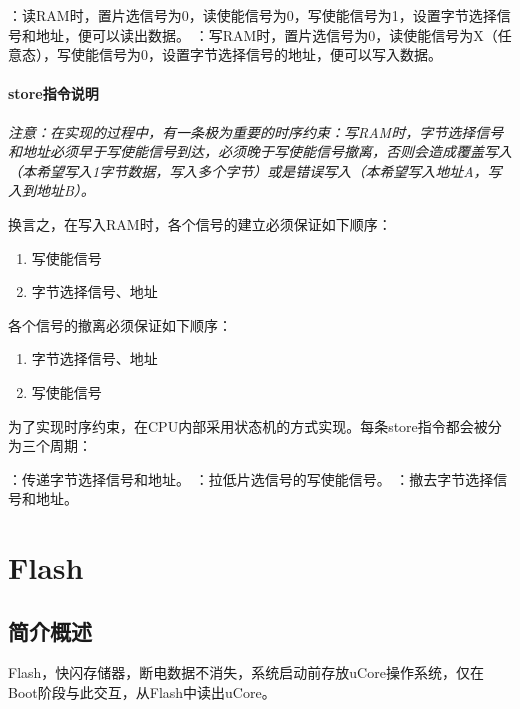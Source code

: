         \begin{enumerate}
            ：读RAM时，置片选信号为0，读使能信号为0，写使能信号为1，设置字节选择信号和地址，便可以读出数据。
            ：写RAM时，置片选信号为0，读使能信号为X（任意态），写使能信号为0，设置字节选择信号的地址，便可以写入数据。
        \end{enumerate}

        \paragraph{store指令说明}
        \emph{注意：在实现的过程中，有一条极为重要的时序约束：写RAM时，字节选择信号和地址必须早于写使能信号到达，必须晚于写使能信号撤离，否则会造成覆盖写入（本希望写入1字节数据，写入多个字节）或是错误写入（本希望写入地址A，写入到地址B）。}

        换言之，在写入RAM时，各个信号的建立必须保证如下顺序：
        \begin{enumerate}
            \item 写使能信号
            \item 字节选择信号、地址
        \end{enumerate}

        各个信号的撤离必须保证如下顺序：
        \begin{enumerate}
            \item 字节选择信号、地址
            \item 写使能信号
        \end{enumerate}

        为了实现时序约束，在CPU内部采用状态机的方式实现。每条store指令都会被分为三个周期：
        \begin{enumerate}
            ：传递字节选择信号和地址。
            ：拉低片选信号的写使能信号。
            ：撤去字节选择信号和地址。
        \end{enumerate}

\section{Flash}

    \subsection{简介概述}
    Flash，快闪存储器，断电数据不消失，系统启动前存放uCore操作系统，仅在Boot阶段与此交互，从Flash中读出uCore。

